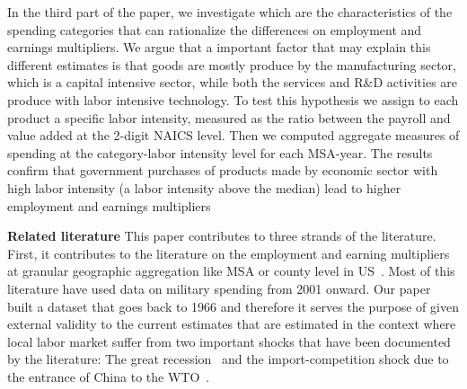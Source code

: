 \documentclass[dv_diss_main.tex]{subfiles}
\begin{document}
In the third part of the paper, we investigate which are the characteristics of the spending categories that can rationalize the differences on employment and earnings multipliers. We argue that a important factor that may explain this different estimates is that goods are mostly produce by the manufacturing sector, which is a capital intensive sector, while both the services and R\&D activities are produce with labor intensive technology. 
To test this hypothesis we assign to each product a specific labor intensity, measured as the ratio between the payroll and value added at the 2-digit NAICS level. Then we computed aggregate measures of spending at the category-labor intensity level for each MSA-year. The results confirm that government purchases of products made by economic sector with high labor intensity (a labor intensity above the median) lead to higher employment and earnings multipliers

\textbf{Related literature} This paper contributes to three strands of the literature. First, it contributes to the literature on the employment and earning multipliers at granular geographic aggregation like MSA or county level in US~\citep{suarez2016estimating,Demyanyk2019,Auerbach2019,Auerbach2020,Juarros2021}. Most of this literature have used data on military spending from 2001 onward. Our paper built a dataset that goes back to 1966 and therefore it serves the purpose of given external validity to the current estimates that are estimated in the context where local labor market suffer from two important shocks that have been documented by the literature: The great recession~\citep{yagan2019employment} and the import-competition shock due to the entrance of China to the WTO~\citep{autor2016importing}. 
\end{document}
